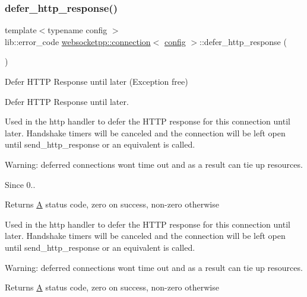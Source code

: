 \subsubsection{\texorpdfstring{defer\+\_\+http\+\_\+response()}{defer\_http\_response()}}
{\footnotesize\ttfamily template$<$typename config $>$ \\
lib\+::error\+\_\+code \mbox{\hyperlink{classwebsocketpp_1_1connection}{websocketpp\+::connection}}$<$ \mbox{\hyperlink{classconfig}{config}} $>$\+::defer\+\_\+http\+\_\+response (\begin{DoxyParamCaption}{ }\end{DoxyParamCaption})}



Defer H\+T\+TP Response until later (Exception free) 

Defer H\+T\+TP Response until later.

Used in the http handler to defer the H\+T\+TP response for this connection until later. Handshake timers will be canceled and the connection will be left open until {\ttfamily send\+\_\+http\+\_\+response} or an equivalent is called.

Warning\+: deferred connections won\textquotesingle{}t time out and as a result can tie up resources.

\begin{DoxySince}{Since}
0..
\end{DoxySince}
\begin{DoxyReturn}{Returns}
\mbox{\hyperlink{struct_a}{A}} status code, zero on success, non-\/zero otherwise
\end{DoxyReturn}
Used in the http handler to defer the H\+T\+TP response for this connection until later. Handshake timers will be canceled and the connection will be left open until {\ttfamily send\+\_\+http\+\_\+response} or an equivalent is called.

Warning\+: deferred connections won\textquotesingle{}t time out and as a result can tie up resources.

\begin{DoxyReturn}{Returns}
\mbox{\hyperlink{struct_a}{A}} status code, zero on success, non-\/zero otherwise 
\end{DoxyReturn}
\mbox{\label{classwebsocketpp_1_1connection_a41a23575fcdad7f8afe25b2fabe12593}} 
